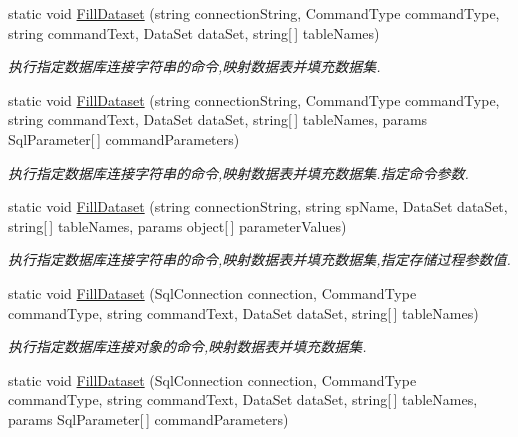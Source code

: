 \begin{DoxyCompactItemize}
static void \hyperlink{class_x_c_l_net_tools_1_1_data_base_1_1_m_s_s_q_l_1_1_sql_helper_a38fc54ab85679d2029119d894bdcdc42}{Fill\-Dataset} (string connection\-String, Command\-Type command\-Type, string command\-Text, Data\-Set data\-Set, string\mbox{[}$\,$\mbox{]} table\-Names)
\begin{DoxyCompactList}\small\item\em 执行指定数据库连接字符串的命令,映射数据表并填充数据集. \end{DoxyCompactList}\item 
static void \hyperlink{class_x_c_l_net_tools_1_1_data_base_1_1_m_s_s_q_l_1_1_sql_helper_ac7eefd77457caef01af061870b7da597}{Fill\-Dataset} (string connection\-String, Command\-Type command\-Type, string command\-Text, Data\-Set data\-Set, string\mbox{[}$\,$\mbox{]} table\-Names, params Sql\-Parameter\mbox{[}$\,$\mbox{]} command\-Parameters)
\begin{DoxyCompactList}\small\item\em 执行指定数据库连接字符串的命令,映射数据表并填充数据集.\-指定命令参数. \end{DoxyCompactList}\item 
static void \hyperlink{class_x_c_l_net_tools_1_1_data_base_1_1_m_s_s_q_l_1_1_sql_helper_a2688bea134b820ddaaa75df7d1f21a9b}{Fill\-Dataset} (string connection\-String, string sp\-Name, Data\-Set data\-Set, string\mbox{[}$\,$\mbox{]} table\-Names, params object\mbox{[}$\,$\mbox{]} parameter\-Values)
\begin{DoxyCompactList}\small\item\em 执行指定数据库连接字符串的命令,映射数据表并填充数据集,指定存储过程参数值. \end{DoxyCompactList}\item 
static void \hyperlink{class_x_c_l_net_tools_1_1_data_base_1_1_m_s_s_q_l_1_1_sql_helper_a5d6bc0465743a2e0e0a488cafebc9b81}{Fill\-Dataset} (Sql\-Connection connection, Command\-Type command\-Type, string command\-Text, Data\-Set data\-Set, string\mbox{[}$\,$\mbox{]} table\-Names)
\begin{DoxyCompactList}\small\item\em 执行指定数据库连接对象的命令,映射数据表并填充数据集. \end{DoxyCompactList}\item 
static void \hyperlink{class_x_c_l_net_tools_1_1_data_base_1_1_m_s_s_q_l_1_1_sql_helper_a0175af253c5eb7e42adc14742fa9798e}{Fill\-Dataset} (Sql\-Connection connection, Command\-Type command\-Type, string command\-Text, Data\-Set data\-Set, string\mbox{[}$\,$\mbox{]} table\-Names, params Sql\-Parameter\mbox{[}$\,$\mbox{]} command\-Parameters)

\end{DoxyCompactItemize}
